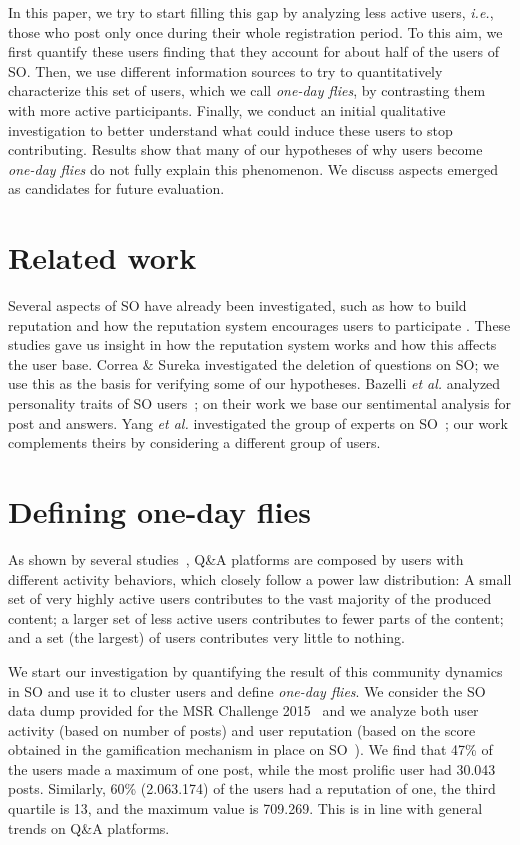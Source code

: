 \documentclass[conference]{IEEEtran}
\newcommand{\ie}{\emph{i.e.},\xspace}
\newcommand{\etal}{\emph{et al.}\xspace}
\newcommand\odf{\emph{one-day flies}\xspace}
\begin{document}
In this paper, we try to start filling this gap by analyzing less active users,
\ie those who post only once during their whole registration period.  To this
aim, we first quantify these users finding that they account for about half of
the users of SO. Then, we use different information sources to try to
quantitatively characterize this set of users, which we call \odf, by
contrasting them with more active participants.  Finally, we conduct an initial
qualitative investigation to better understand what could induce these users to
stop contributing.  Results show that many of our hypotheses of why users
become \odf do not fully explain this phenomenon. We discuss aspects emerged as 
candidates for future evaluation.



\section{Related work}

Several aspects of SO have already been investigated, such as how to build
reputation \cite{bosu2013building} and how the reputation system encourages
users to participate \cite{movshovitz2013analysis}. These studies gave us
insight in how the reputation system works and how this affects the user base. 
Correa \& Sureka \cite{correa2014chaff} investigated the deletion of
questions on SO; we use this as the basis for verifying some of our hypotheses.
Bazelli \etal analyzed personality traits of SO
users~\cite{bazelli2013personality}; on their work we base our sentimental
analysis for post and answers. 
Yang \etal investigated the group of experts on
SO~\cite{yang2014sparrows}; our work complements theirs by considering a
different group of users.


\section{Defining one-day flies}

As shown by several studies~\cite{yang2014sparrows}, Q\&A platforms are
composed by users with different activity behaviors, which closely follow a
power law distribution: A small set of very highly active users contributes
to the vast majority of the produced content; a larger set of less active users
contributes to fewer parts of the content; and a set (the largest) of users
contributes very little to nothing.

We start our investigation by quantifying the result of this community dynamics
in SO and use it to cluster users and define \odf. We consider the SO data dump
provided for the MSR Challenge 2015~\cite{MSRChallenge2015} and we analyze both
user activity (based on number of posts) and user reputation (based on the
score obtained in the gamification mechanism in place on
SO~\cite{anderson2013steering}).  We find that 47\% of the users made a maximum
of one post, while the most prolific user had 30.043 posts. Similarly, 60\%
(2.063.174) of the users had a reputation of one, the third quartile is 13, and
the maximum value is 709.269.  This is in line with general trends on Q\&A
platforms.
\end{document}
